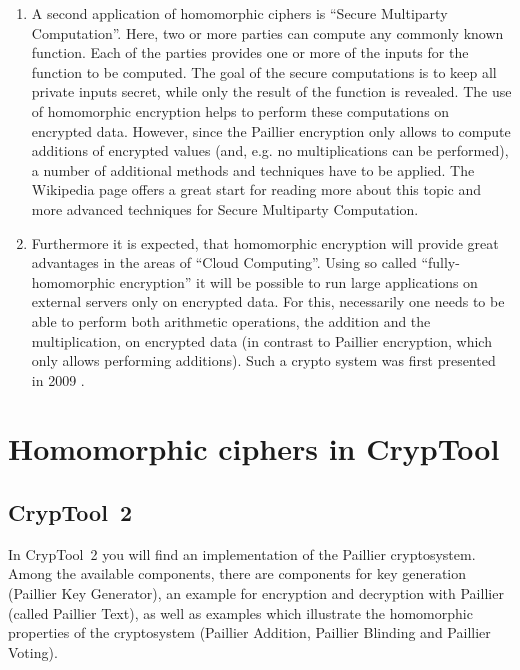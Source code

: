\begin{bibunit}[babalpha]
\begin{enumerate}
\item A second application of homomorphic ciphers is ``Secure Multiparty Computation''. Here, two or more parties can compute any commonly known function. Each of the parties provides one or more of the inputs for the function to be computed. The goal of the secure computations is to keep all private inputs secret, while only the result of the function is revealed. The use of homomorphic encryption helps to perform these computations on encrypted data. However, since the Paillier encryption only allows to compute additions of encrypted values (and, e.g. no multiplications can be performed), a number of additional methods and techniques have to be applied. The Wikipedia page \cite{Wiki_SMC} offers a great start for reading more about this topic and more advanced techniques for Secure Multiparty Computation.

\item Furthermore it is expected, that homomorphic encryption will provide great advantages in the areas of ``Cloud Computing''. Using so called ``fully-homomorphic encryption'' \cite{Wiki_HomEnc} it will be possible to run large applications on external servers only on encrypted data. For this, necessarily one needs to be able to perform both arithmetic operations, the addition and the multiplication, on encrypted data (in contrast to Paillier encryption, which only allows performing additions). Such a crypto system was first presented in 2009 \cite{Gentry2009}.
\end{enumerate}

\section{Homomorphic ciphers in CrypTool}

\subsection{CrypTool~2}

In CrypTool~2 you will find an implementation of the Paillier cryptosystem. Among the available components, there are components for key generation (Paillier Key Generator), an example for encryption and decryption with Paillier (called Paillier Text), as well as examples which illustrate the homomorphic properties of the cryptosystem (Paillier Addition, Paillier Blinding and Paillier Voting).


\end{bibunit}
